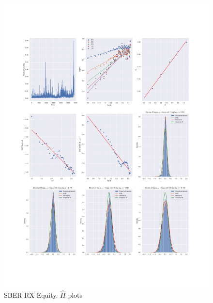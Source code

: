 \begin{figure}[h]
    \centering
    \includegraphics[width=\linewidth]{fig/SBER RX Equity.pdf}
    \caption{SBER RX Equity. $\hat{H}$ plots}
\end{figure}

